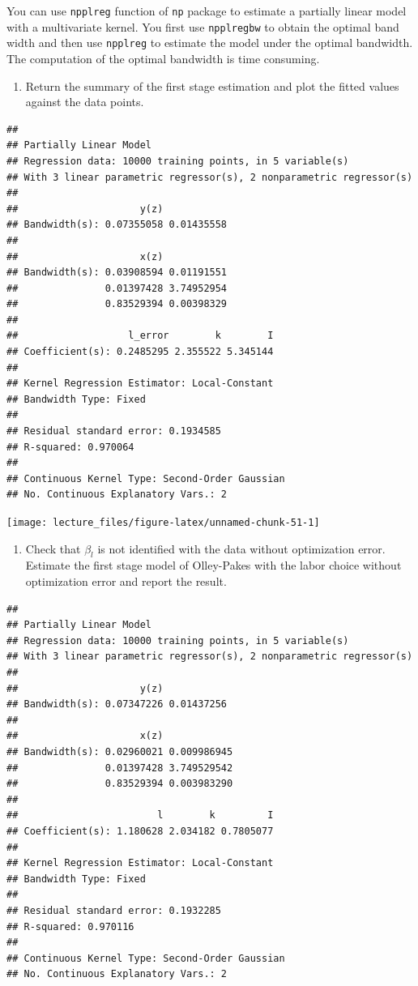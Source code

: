 \documentclass[]{book}
\providecommand{\tightlist}{%
  \setlength{\itemsep}{0pt}\setlength{\parskip}{0pt}}
\begin{document}
You can use \texttt{npplreg} function of \texttt{np} package to estimate
a partially linear model with a multivariate kernel. You first use
\texttt{npplregbw} to obtain the optimal band width and then use
\texttt{npplreg} to estimate the model under the optimal bandwidth. The
computation of the optimal bandwidth is time consuming.

\begin{enumerate}
\def\labelenumi{\arabic{enumi}.}
\setcounter{enumi}{2}
\tightlist
\item
  Return the summary of the first stage estimation and plot the fitted
  values against the data points.
\end{enumerate}

\begin{verbatim}
## 
## Partially Linear Model
## Regression data: 10000 training points, in 5 variable(s)
## With 3 linear parametric regressor(s), 2 nonparametric regressor(s)
## 
##                     y(z)           
## Bandwidth(s): 0.07355058 0.01435558
## 
##                     x(z)           
## Bandwidth(s): 0.03908594 0.01191551
##               0.01397428 3.74952954
##               0.83529394 0.00398329
## 
##                   l_error        k        I
## Coefficient(s): 0.2485295 2.355522 5.345144
## 
## Kernel Regression Estimator: Local-Constant
## Bandwidth Type: Fixed
## 
## Residual standard error: 0.1934585
## R-squared: 0.970064
## 
## Continuous Kernel Type: Second-Order Gaussian
## No. Continuous Explanatory Vars.: 2
\end{verbatim}

\begin{center}\texttt{[image: lecture\_files/figure-latex/unnamed-chunk-51-1]} \end{center}

\begin{enumerate}
\def\labelenumi{\arabic{enumi}.}
\setcounter{enumi}{3}
\tightlist
\item
  Check that \(\beta_l\) is not identified with the data without
  optimization error. Estimate the first stage model of Olley-Pakes with
  the labor choice without optimization error and report the result.
\end{enumerate}

\begin{verbatim}
## 
## Partially Linear Model
## Regression data: 10000 training points, in 5 variable(s)
## With 3 linear parametric regressor(s), 2 nonparametric regressor(s)
## 
##                     y(z)           
## Bandwidth(s): 0.07347226 0.01437256
## 
##                     x(z)            
## Bandwidth(s): 0.02960021 0.009986945
##               0.01397428 3.749529542
##               0.83529394 0.003983290
## 
##                        l        k         I
## Coefficient(s): 1.180628 2.034182 0.7805077
## 
## Kernel Regression Estimator: Local-Constant
## Bandwidth Type: Fixed
## 
## Residual standard error: 0.1932285
## R-squared: 0.970116
## 
## Continuous Kernel Type: Second-Order Gaussian
## No. Continuous Explanatory Vars.: 2
\end{verbatim}
\end{document}
